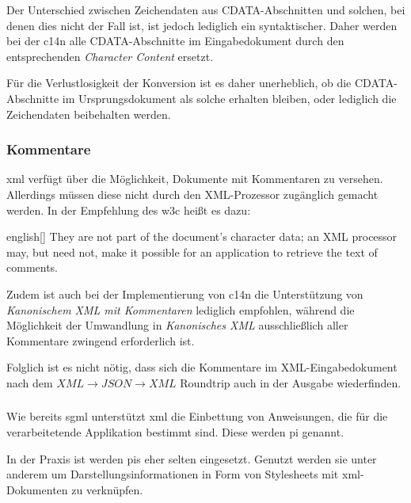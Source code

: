 Der Unterschied zwischen Zeichendaten aus CDATA-Abschnitten und solchen, bei denen dies nicht der Fall ist, ist jedoch lediglich ein syntaktischer. Daher werden bei der \acrlong{c14n} alle CDATA-Abschnitte im Eingabedokument durch den entsprechenden \emph{Character Content} ersetzt\cite[Abschnitt~2.1]{boyer2001c14n}.

Für die Verlustlosigkeit der Konversion ist es daher unerheblich, ob die CDATA-Abschnitte im Ursprungsdokument als solche erhalten bleiben, oder lediglich die Zeichendaten beibehalten werden.

\subsubsection{Kommentare}

\acrshort{xml} verfügt über die Möglichkeit, Dokumente mit Kommentaren zu versehen. Allerdings müssen diese nicht durch den XML-Prozessor zugänglich gemacht werden. In der Empfehlung des \gls{w3c} heißt es dazu:

\begin{foreigndisplayquote}{english}[{\cite[Abschnitt~2.5]{maler2008xml}}]
They are not part of the document's character data; an XML processor may, but need not, make it possible for an application to retrieve the text of comments.
\end{foreigndisplayquote}

Zudem ist auch bei der Implementierung von \acrlong{c14n} die Unterstützung von \emph{Kanonischem XML mit Kommentaren} lediglich empfohlen, während die Möglichkeit der Umwandlung in \emph{Kanonisches XML} ausschließlich aller Kommentare zwingend erforderlich ist.\cite[Abschnitt~2.1]{boyer2001c14n}

Folglich ist es nicht nötig, dass sich die Kommentare im XML-Eingabedokument nach dem $XML\rightarrow{}JSON\rightarrow{}XML$ Roundtrip auch in der Ausgabe wiederfinden.

\subsubsection{}

Wie bereits \acrshort{sgml} unterstützt \acrshort{xml} die Einbettung von Anweisungen, die für die verarbeitetende Applikation bestimmt sind. Diese werden \acrfull{pi} genannt. 

In der Praxis ist werden \glspl{pi} eher selten eingesetzt. Genutzt werden sie unter anderem um Darstellungsinformationen in Form von Stylesheets mit \acrshort{xml}-Dokumenten zu verknüpfen.\cite[Abschnitt 4]{xmlstylesheet}

